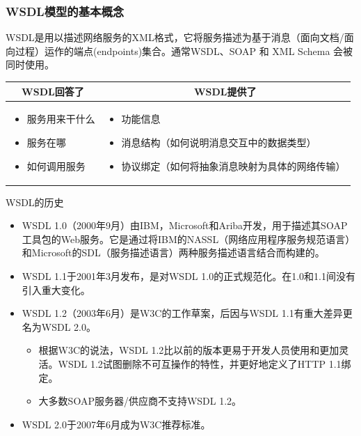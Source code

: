 \subsubsection{WSDL模型的基本概念}
WSDL是用以描述网络服务的XML格式，它将服务描述为基于消息（面向文档/面向过程）运作的端点(endpoints)集合。通常WSDL、SOAP 和 XML Schema 会被同时使用。
\vspace{-0.5em}
\begin{spacing}{1.2}
    \begin{longtable}{|m{4cm}|m{9cm}|}
        \hline
        \multicolumn{1}{|c|}{WSDL回答了}  &  \multicolumn{1}{c|}{WSDL提供了}\\ \hline
        \vspace{-1.3em}
        \begin{itemize}[leftmargin=1.5em,itemsep=-2pt]
            \item 服务用来干什么
            \item 服务在哪
            \item 如何调用服务
            \vspace{-1.5em}
        \end{itemize} &  
        \vspace{-1.3em}
        \begin{itemize}[leftmargin=1.5em,itemsep=-2pt]
            \item 功能信息
            \item 消息结构（如何说明消息交互中的数据类型）
            \item 协议绑定（如何将抽象消息映射为具体的网络传输）
            \vspace{-1.5em}
        \end{itemize}
        \\\hline
    \end{longtable}
\end{spacing}
\vspace{-1em}

WSDL的历史
\begin{itemize}
    \item WSDL 1.0（2000年9月）由IBM，Microsoft和Ariba开发，用于描述其SOAP工具包的Web服务。它是通过将IBM的NASSL（网络应用程序服务规范语言）和Microsoft的SDL（服务描述语言）两种服务描述语言结合而构建的。
    \item WSDL 1.1于2001年3月发布，是对WSDL 1.0的正式规范化。在1.0和1.1间没有引入重大变化。
    \item WSDL 1.2（2003年6月）是W3C的工作草案，后因与WSDL 1.1有重大差异更名为WSDL 2.0。
    \begin{itemize}
        \item 根据W3C的说法，WSDL 1.2比以前的版本更易于开发人员使用和更加灵活。WSDL 1.2试图删除不可互操作的特性，并更好地定义了HTTP 1.1绑定。
        \item 大多数SOAP服务器/供应商不支持WSDL 1.2。
    \end{itemize}
    \item WSDL 2.0于2007年6月成为W3C推荐标准。
\end{itemize}

